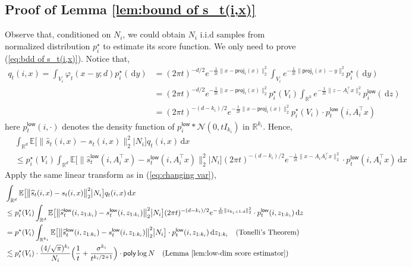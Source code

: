 \documentclass{article}
\newcommand{\diff}{\,\mathrm{d}}
\newcommand{\polylog}{\mathsf{poly}\log}
\newcommand{\proj}{\mathsf{proj}}
\newcommand{\low}{\mathsf{low}}
\theoremstyle{plain}
\theoremstyle{remark}
\begin{document}
\subsection{Proof of Lemma \ref{lem:bound of s_t(i,x)}}
\label{pf-of-lem:lem:bound of s_t(i,x)}
Observe that, conditioned on $N_i $, we could obtain $N_i$ i.i.d samples from normalized distribution $p_i^\star$ to estimate its score function.   
        We only need to prove (\ref{eq:bdd of s_t(i,x)}). Notice that, 
        \begin{align*}
            q_t(i,x) = \int_{V_i} \varphi_t(x-y;d) p_i^\star(\!\diff y) &= (2\pi t)^{-d/2} e^{-\frac{1}{2t}\| x-\proj_i(x)\|_2^2} \int_{V_i} e^{-\frac{1}{2t}\| \proj_i(x)-y\|_2^2} p_i^\star( \!\diff y) \\
            &= (2\pi t)^{-d/2} e^{-\frac{1}{2t}\| x-\proj_i(x)\|_2^2} p_i^\star(V_i) \int_{\mathbb{R}^k} e^{-\frac{1}{2t}\| z - A_i^{\top}x\|_2^2} p_i^{\low}(\! \diff z) \\
            &= (2\pi t)^{-(d-k_i)/2} e^{-\frac{1}{2t}\| x-\proj_i(x)\|_2^2} p_i^\star(V_i) \cdot p_t^{\low}(i,A_i^{\top}x)
        \end{align*}
        here $p_t^{\low}(i,\cdot)$ denotes the density function of $p_i^{\low} \ast \mathcal{N}(0,tI_{k_i})$ in $\mathbb{R}^{k_i}$. 
        Hence, 
        \begin{align*}
            &\int_{\mathbb{R}^d} \mathbb{E}\big[\big\| \widehat{s}_t(i,x) - s_t(i,x)\big\|_2^2 \big| N_i \big] q_t(i,x)  \diff x \\
            &\leq p_i^\star(V_i)\int_{\mathbb{R}^d} \mathbb{E}\big[\big\| \widehat{s}_t^{\low}(i,A_i^{\top}x) - s_t^{\low}(i,A_i^{\top}x)\big\|_2^2\big| N_i \big] (2\pi t)^{-(d-k_i)/2} e^{-\frac{1}{2t}\| x-A_iA_i^{\top}x\|_2^2}  \cdot p_t^{\low}(i,A_i^{\top}x)  \diff x
        \end{align*}
        Apply the same linear transform as in (\ref{eq:changing var}), 
    \begin{align*}
        &\int_{\mathbb{R}^d} \mathbb{E}\big[\big\| \widehat{s}_t(i,x) - s_t(i,x)\big\|_2^2 \big| N_i \big] q_t(i,x)  \diff x \\ 
        &\leq p_i^{\star}(V_i) \int_{\mathbb{R}^d} \mathbb{E}\big[\big\| \widehat{s}_t^{\low}(i,z_{1:{k_i}}) - s_t^{\low}(i,z_{1:{k_i}})\big\|_2^2 \big| N_i \big] (2\pi t)^{-(d-k_i)/2} e^{-\frac{1}{2t}\| z_{k_i+1:d}\|_2^2}  \cdot p_t^{\low}(i,z_{1:k_i})  \diff z\\
        &= p^\star(V_i) \int_{\mathbb{R}^{k_i}} \mathbb{E}\big[\big\| \widehat{s}_t^{\low}(i,z_{1:k_i}) - s_t^{\low}(i,z_{1:k_i})\big\|_2^2  \big| N_i \big]   \cdot p_t^{\low}(i,z_{1:k_i})  \diff z_{1:k_i} \quad (\text{Tonelli's Theorem})\\
        &\lesssim p_i^{\star}(V_i) \cdot \frac{(4/\sqrt{\pi})^{k_i}}{N_i}\Big( \frac{1}{t}+\frac{\sigma^{k_i}}{t^{k_i/2+1}}\Big) \cdot \polylog N \quad (\text{Lemma \ref{lem:low-dim score estimator}})
    \end{align*}
\end{document}
